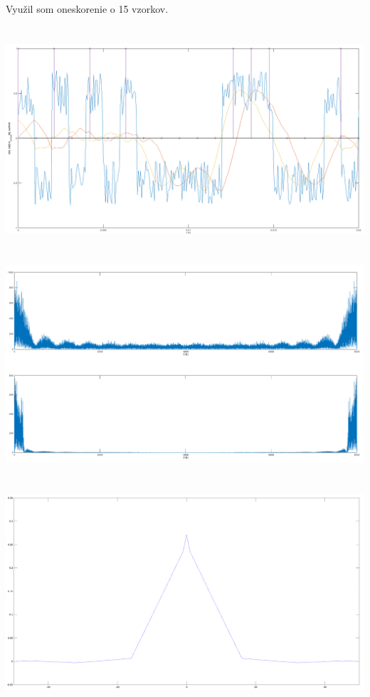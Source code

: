\documentclass[a4paper,12pt,twocolumn]{article}
\begin{document}
\section{}
Využil som oneskorenie o 15 vzorkov.
\section{}
\includegraphics[width=\linewidth]{6}
\section{}
\section{}
\includegraphics[width=\linewidth]{8}
\section{}
\section{}
\includegraphics[width=\linewidth]{10}
\end{document}
